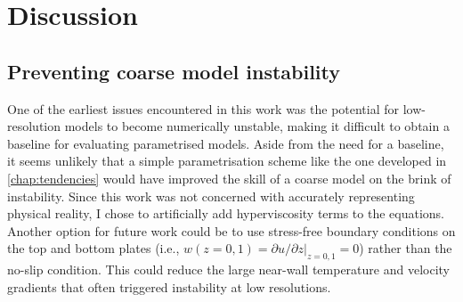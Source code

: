 \documentclass[../main.tex]{subfiles}
\begin{document}
\ifSubfilesClassLoaded{
    \frontmatter
    \tableofcontents
    \mainmatter
}{}

\chapter{Discussion} \label{chap:conclusion}
\setlength{\epigraphwidth}{.45\textwidth}




\section{Preventing coarse model instability}
One of the earliest issues encountered in this work was the potential for
low-resolution models to become numerically unstable, making it difficult to
obtain a baseline for evaluating parametrised models. Aside from the need for
a baseline, it seems unlikely that a simple parametrisation scheme like the one
developed in \cref{chap:tendencies} would have improved the skill of a
coarse model on the brink of instability. Since this work was not concerned
with accurately representing physical reality, I chose to artificially add
hyperviscosity terms to the equations. Another option for future work could be
to use stress-free boundary conditions on the top and bottom plates (i.e.,
$w(z=0,1) = \partial u/\partial z|_{z=0,1} = 0$) rather than the no-slip
condition. This could reduce the large near-wall temperature and velocity
gradients that often triggered instability at low resolutions.
\end{document}
